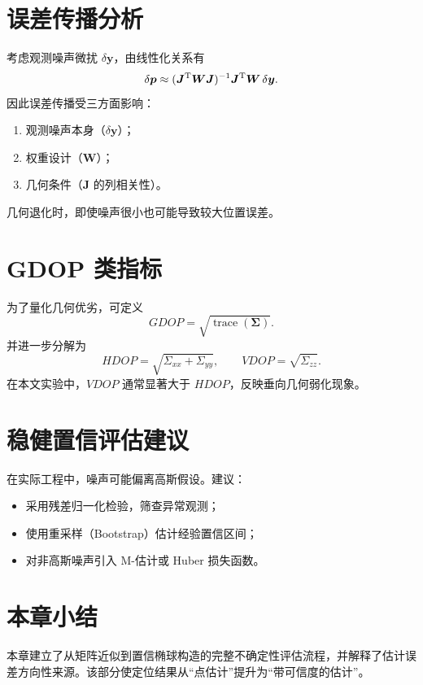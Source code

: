 \section{误差传播分析}
考虑观测噪声微扰 $\delta\bm y$，由线性化关系有
\[
\delta\bm p\approx(\bm J^{\mathrm{T}}\bm W\bm J)^{-1}\bm J^{\mathrm{T}}\bm W\,\delta\bm y.
\]
因此误差传播受三方面影响：
\begin{enumerate}
  \item 观测噪声本身（$\delta\bm y$）；
  \item 权重设计（$\bm W$）；
  \item 几何条件（$\bm J$ 的列相关性）。
\end{enumerate}
几何退化时，即使噪声很小也可能导致较大位置误差。

\section{GDOP 类指标}
为了量化几何优劣，可定义
\[
GDOP=\sqrt{\operatorname{trace}(\bm\Sigma)}.
\]
并进一步分解为
\[
HDOP=\sqrt{\Sigma_{xx}+\Sigma_{yy}},\qquad
VDOP=\sqrt{\Sigma_{zz}}.
\]
在本文实验中，$VDOP$ 通常显著大于 $HDOP$，反映垂向几何弱化现象。

\section{稳健置信评估建议}
在实际工程中，噪声可能偏离高斯假设。建议：
\begin{itemize}
  \item 采用残差归一化检验，筛查异常观测；
  \item 使用重采样（Bootstrap）估计经验置信区间；
  \item 对非高斯噪声引入 M-估计或 Huber 损失函数。
\end{itemize}

\section{本章小结}
本章建立了从矩阵近似到置信椭球构造的完整不确定性评估流程，并解释了估计误差方向性来源。该部分使定位结果从“点估计”提升为“带可信度的估计”。
